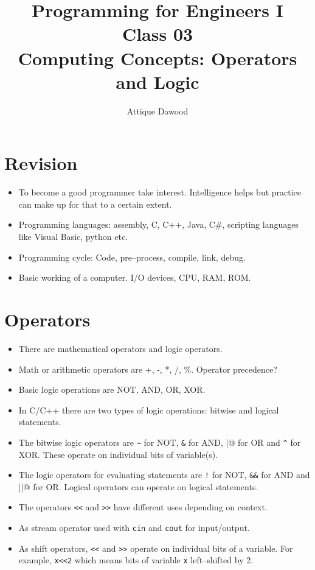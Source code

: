 \documentclass[12pt,a4paper]{article}
\title{\vspace{-2cm}Programming for Engineers I\\Class 03\\Computing Concepts: Operators and Logic}
\author{Attique Dawood}
\begin{document}
\maketitle
\section{Revision}
\begin{itemize}
\item To become a good programmer take interest. Intelligence helps but practice can make up for that to a certain extent.
\item Programming languages: assembly, C, C++, Java, C\#, scripting languages like Visual Basic, python etc.
\item Programming cycle: Code, pre--process, compile, link, debug.
\item Basic working of a computer. I/O devices, CPU, RAM, ROM.
\end{itemize}
\section{Operators}
\begin{itemize}
\item There are mathematical operators and logic operators.
\item Math or arithmetic operators are +, -, *, /, \%. Operator precedence?
\item Basic logic operations are NOT, AND, OR, XOR.
\item In C/C++ there are two types of logic operations: bitwise and logical statements.
\item The bitwise logic operators are \verb|~| for NOT, \verb|&| for AND, \verb@|@ for OR and \verb|^| for XOR. These operate on individual bits of variable(s).
\item The logic operators for evaluating statements are \verb|!| for NOT, \verb|&&| for AND and \verb@||@ for OR. Logical operators can operate on logical statements.
\item The operators \verb|<<| and \verb|>>| have different uses depending on context.
\item As stream operator used with \verb|cin| and \verb|cout| for input/output.
\item As shift operators, \verb|<<| and \verb|>>| operate on individual bits of a variable. For example, \verb|x<<2| which means bits of variable \verb|x| left--shifted by 2.

\end{itemize}
\end{document}
